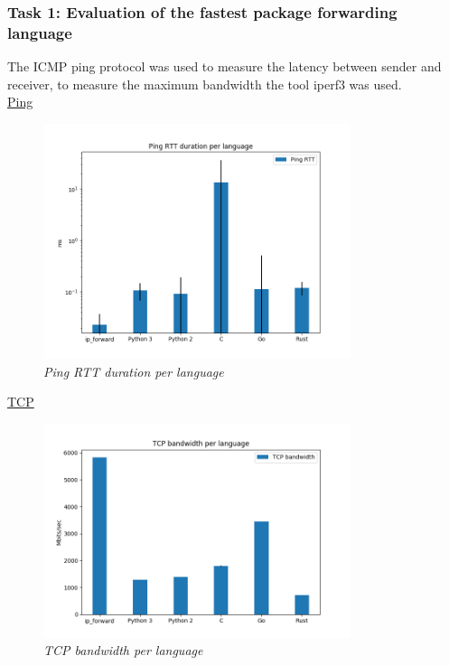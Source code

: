 \subsubsection{Task 1: Evaluation of the fastest package forwarding language}
The ICMP ping protocol was used to measure the latency between sender and receiver, to measure the maximum bandwidth the tool iperf3 was used.\\
\underline{Ping}\\
\begin{figure}[h]
\centering
\includegraphics*[width=9cm]{ping}
\caption{\em Ping RTT duration per language}
\label{fig:ping}
\end{figure}


\underline{TCP}\\
\begin{figure}[h]
\centering
\includegraphics*[width=9cm]{tcp}
\caption{\em TCP bandwidth per language}
\label{fig:tcp}
\end{figure}

